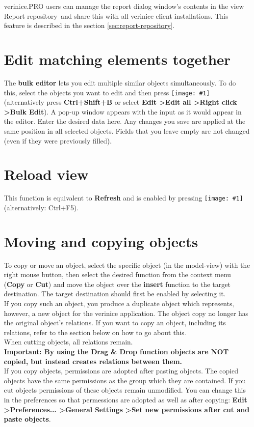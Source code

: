 \documentclass[a4paper,10pt]{book}
\newcommand{\icon}[1]{\texttt{[image: \#1]}}
\begin{document}
verinice.PRO users can manage the report dialog window's contents in
the view \glqq Report repository\grqq\ and share this with all
verinice client installations. This feature is described in the
section \ref{sec:report-repository}.


\section{Edit matching elements together}
The \textbf{bulk editor} lets you edit multiple similar objects simultaneously.
To do this, select the objects you want to edit and then press \icon{Icon/Masseneditor.png}
(alternatively press \textbf{Ctrl+Shift+B} or select \textbf{Edit \textgreater Edit all \textgreater Right click \textgreater Bulk Edit}).
A pop-up window appears with the input as it would appear in the editor. Enter
the desired data here. Any changes you save are applied at the same position in all selected objects.
Fields that you leave empty are not changed (even if they were previously filled).

\section{Reload view}
This function is equivalent to \textbf{Refresh} and is enabled by pressing
\icon{Icon/Aktualisieren.png} (alternatively: Ctrl+F5).

\section{Moving and copying objects}
To copy or move an object, select the specific object (in the model-view) with the right mouse button, then select the desired function from the context menu (\textbf{Copy} or \textbf{Cut}) and move the object over the \textbf{insert} function to the target destination. The target destination should first be enabled by selecting it.
\newline\\
If you copy such an object, you produce a duplicate object which represents, however, a new object for the verinice application. The object copy no longer has the original object's relations. If you want to copy an object, including its relations, refer to the section below on how to go about this.
\newline\\
When cutting objects, all relations remain.
\newline\\
\textbf{Important: By using the Drag \& Drop function objects are NOT copied, but instead creates relations between them.}
\newline\\
If you copy objects, permissions are adopted after pasting objects. The copied objects have the same permissions as the group which they are contained. If you cut objects permissions of these objects remain unmodified. You can change this in the preferences so that permessions are adopted as well as after copying: \textbf{Edit \textgreater Preferences... \textgreater General Settings
  \textgreater Set new permissions after cut and paste objects}.
\end{document}

